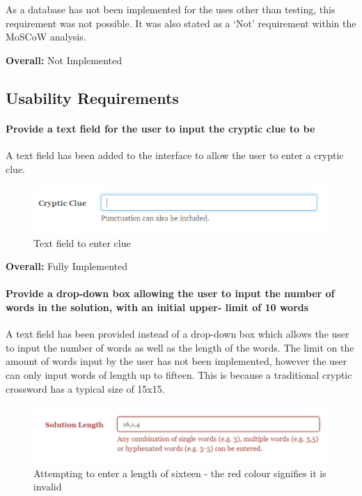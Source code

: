 As a database has not been implemented for the uses other than testing,  this
requirement was not possible. It was also stated as a `Not' requirement  within
the MoSCoW analysis.

{\bf Overall:} Not Implemented


\subsection{Usability Requirements}
\label{sub:test_func_usability}


\paragraph{Provide a text field for the user to input the cryptic clue to be}

A text field has been added to the interface to allow the user to enter a 
cryptic clue. 

\begin{figure}[H]
	\centering
	 \includegraphics[keepaspectratio=true]{evidence/enterclue.png}
	\caption{Text field to enter clue}
\end{figure}

{\bf Overall:} Fully Implemented


\paragraph{Provide a drop-down box allowing the user to input the number of
words in the solution, with an initial upper- limit of 10 words}

A text field has been provided instead of a drop-down box which allows the user
to input the number of words as well as the length of the words. The limit on
the amount of words input by the user has not been implemented, however the
user  can only input words of length up to fifteen. This is because a
traditional cryptic  crossword has a typical size of 15x15.

\begin{figure}[H]
	\centering
	\includegraphics[keepaspectratio=true]{evidence/dropdown1.png}
	\caption{Attempting to enter a length of sixteen - the red colour signifies it
	is invalid}
\end{figure}

